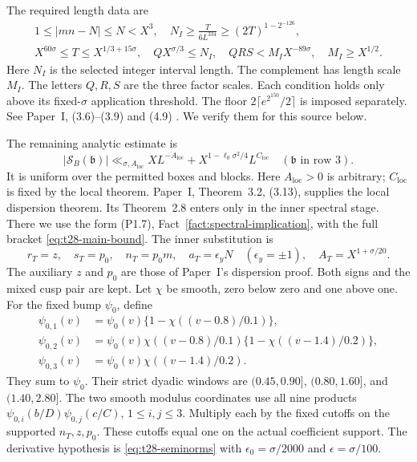 The required length data are
\begin{equation}\label{eq:l3-lengths}
\begin{gathered}
 1\le|mn-N|\le N<X^3,\quad
 N_I\ge\frac{T}{6L^{334}}\ge(2T)^{1-2^{-126}},\\
 X^{60\sigma}\le T\le X^{1/3+15\sigma},\quad
 QX^{\sigma/3}\le N_I,\quad QRS<M_IX^{-89\sigma},\quad M_I\ge X^{1/2}.
\end{gathered}
\end{equation}
Here $N_I$ is the selected integer interval length.
The complement has length scale $M_I$.
The letters $Q,R,S$ are the three factor scales.
Each condition holds only above its fixed-$\sigma$ application threshold.
The floor $2\lceil e^{2^{150}}/2\rceil$ is imposed separately.
See Paper~I, (3.6)--(3.9) and (4.9)
\cite[(3.6)--(3.9), Theorem~4.1, (4.9)]{PaperI}.
We verify them for this source below.

The remaining analytic estimate is
\begin{equation}\label{eq:l3-masked-use}
 |\mathcal S_B(\mathfrak b)|
 \ll_{\sigma,A_{\mathrm{loc}}}XL^{-A_{\mathrm{loc}}}
          +X^{1-\ell_0\sigma^2/4}L^{C_{\mathrm{loc}}}
 \quad(\mathfrak b\text{ in row }3).
\end{equation}
It is uniform over the permitted boxes and blocks.
Here $A_{\mathrm{loc}}>0$ is arbitrary;
$C_{\mathrm{loc}}$ is fixed by the local theorem.
Paper~I, Theorem~3.2, (3.13), supplies the local dispersion theorem.
Its Theorem~2.8 enters only in the inner spectral stage.
There we use the form (P1.7), Fact~\ref{fact:spectral-implication}, with the full bracket
\eqref{eq:t28-main-bound}. The inner substitution is
\begin{equation}\label{eq:l3-spectral-dictionary}
 r_T=z,\quad s_T=p_0,\quad n_T=p_0m,\quad
 a_T=\epsilon_yN\quad(\epsilon_y=\pm1),\quad
 A_T=X^{1+\sigma/20}.
\end{equation}
The auxiliary $z$ and $p_0$ are those of Paper~I's dispersion proof.
Both signs and the mixed cusp pair are kept.
Let $\chi$ be smooth, zero below zero and one above one.
For the fixed bump $\psi_0$, define
\begin{equation}\label{eq:l3-nine-weights}
\begin{aligned}
 \psi_{0,1}(v)&=\psi_0(v)\{1-\chi((v-0.8)/0.1)\},\\
 \psi_{0,2}(v)&=\psi_0(v)\chi((v-0.8)/0.1)
                                  \{1-\chi((v-1.4)/0.2)\},\\
 \psi_{0,3}(v)&=\psi_0(v)\chi((v-1.4)/0.2).
\end{aligned}
\end{equation}
They sum to $\psi_0$.
Their strict dyadic windows are
$(0.45,0.90]$, $(0.80,1.60]$, and $(1.40,2.80]$.
The two smooth modulus coordinates use all nine products
$\psi_{0,i}(b/D)\psi_{0,j}(c/C)$, $1\le i,j\le3$.
Multiply each by the fixed cutoffs on the supported $n_T,z,p_0$.
These cutoffs equal one on the actual coefficient support.
The derivative hypothesis is \eqref{eq:t28-seminorms} with
$\epsilon_0=\sigma/2000$ and $\epsilon=\sigma/100$.

